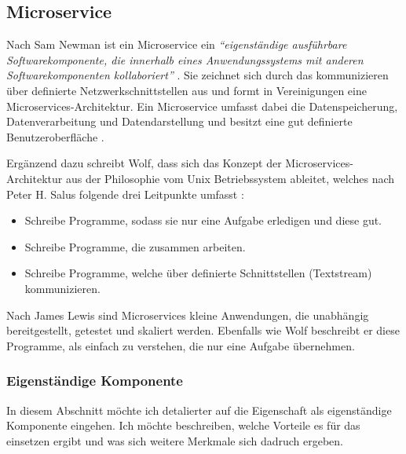 \subsection{Microservice}


Nach Sam Newman ist ein Microservice ein \textit{\enquote{eigenständige ausführbare Softwarekomponente, die innerhalb eines Anwendungssystems mit anderen Softwarekomponenten kollaboriert}} \parencite[][Kap. 2.1]{newman_monolith_2019}. Sie zeichnet sich durch das kommunizieren über definierte Netzwerkschnittstellen aus und formt in Vereinigungen eine Microservices-Architektur. Ein Microservice umfasst dabei die Datenspeicherung, Datenverarbeitung und Datendarstellung und besitzt eine gut definierte Benutzeroberfläche \parencite[vgl.][Kap. 2.1]{newman_monolith_2019}.

Ergänzend dazu schreibt Wolf, dass sich das Konzept der Microservices-Architektur aus der Philosophie vom Unix Betriebssystem ableitet, welches nach Peter H. Salus folgende drei Leitpunkte umfasst \parencites{salus_quarter_1994}[vgl.][Kap. 1.1]{wolff_microservices_2018}:
\begin{itemize}
	\item Schreibe Programme, sodass sie nur eine Aufgabe erledigen und diese gut.
	\item Schreibe Programme, die zusammen arbeiten.
	\item Schreibe Programme, welche über definierte Schnittstellen (Textstream) kommunizieren.
\end{itemize}

Nach James Lewis sind Microservices kleine Anwendungen, die unabhängig bereitgestellt, getestet und skaliert werden. Ebenfalls wie Wolf beschreibt er diese Programme, als einfach zu verstehen, die nur eine Aufgabe übernehmen.

\subsubsection{Eigenständige Komponente}

In diesem Abschnitt möchte ich detalierter auf die Eigenschaft als eigenständige Komponente eingehen. Ich möchte beschreiben, welche Vorteile es für das einsetzen ergibt und was sich weitere Merkmale sich dadruch ergeben.

